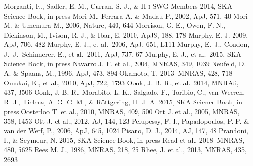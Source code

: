 \begin{thebibliography}{99}
\begin{multicols}{2}
{
    	Morganti, R., Sadler, E. M., Curran, S. J., \& H \textsc{i} SWG Members
    	2014, SKA Science Book, in press
	Mori M., Ferrara A. \& Madau P., 2002, ApJ, 571, 40
	Mori M. \& Umemura M., 2006, Nature, 440, 644
    	Morrison, G. E., Owen, F. N., Dickinson, M., Ivison, R. J., \& Ibar, E. 2010, ApJS, 188, 178
    	Murphy, E. J. 2009, ApJ, 706, 482
    	Murphy, E. J., et al.\ 2006, ApJ, 651, L111
	Murphy, E.~J., Condon, J.~J., Schinnerer, E., et al.\ 2011, ApJ, 737, 67 
    	Murphy, E. J., et al.\ 2015, SKA Science Book, in press
	Navarro J. F. et al., 2004, MNRAS, 349, 1039
     	Neufeld, D. A. \& Spaans, M., 1996, ApJ, 473, 894
   	Okamoto, T. 2013, MNRAS, 428, 718
      Omukai, K., et al., 2010, ApJ, 722, 1793
    	Oonk, J. B. R., et al.\ 2014, MNRAS, 437, 3506
    	Oonk, J. B. R., Morabito, L. K., Salgado, F., Toribio, C., van Weeren, R. J.,
    	Tielens, A. G. G. M., \& R\"{o}ttgering, H. J. A. 2015, SKA Science Book, in press
	Oosterloo T. et al., 2010, MNRAS, 409, 500
	Ott J. et al., 2005, MNRAS, 358, 1453
	Ott J. et al., 2012, AJ, 144, 123
	Pelupessy, F. I., Papadopoulos, P. P. \& van der Werf, P., 2006, ApJ, 645, 1024
	Pisano, D. J., 2014, AJ, 147, 48
    	Prandoni, I., \& Seymour, N. 2015, SKA Science Book, in press
	Read et al., 2018, MNRAS, 480, 5625
	Rees M. J., 1986, MNRAS, 218, 25
	Rhee, J. et al., 2013, MNRAS, 435, 2693
}
\end{multicols}
\end{thebibliography}
